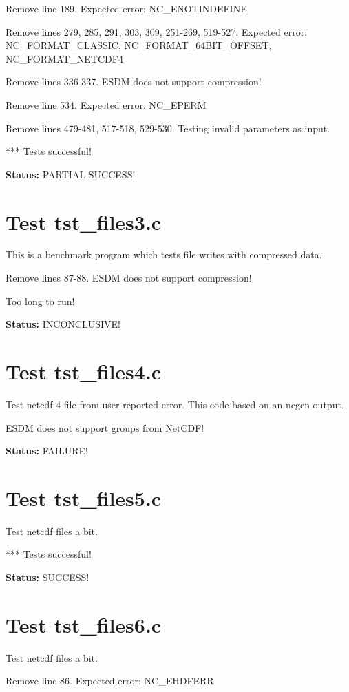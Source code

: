 Remove line 189. Expected error: NC\_ENOTINDEFINE

Remove lines 279, 285, 291, 303, 309, 251-269, 519-527. Expected error: NC\_FORMAT\_CLASSIC, NC\_FORMAT\_64BIT\_OFFSET, NC\_FORMAT\_NETCDF4

Remove lines 336-337. ESDM does not support compression!

Remove line 534. Expected error: NC\_EPERM

Remove lines 479-481, 517-518, 529-530. Testing invalid parameters as input.

*** Tests successful!

{\bf \large Status: } PARTIAL SUCCESS!

\section{Test tst\_files3.c}

This is a benchmark program which tests file writes with compressed data.

Remove lines 87-88. ESDM does not support compression!

Too long to run!

{\bf \large Status: } INCONCLUSIVE!

\section{Test tst\_files4.c}

Test netcdf-4 file from user-reported error. This code based on an ncgen output.

ESDM does not support groups from NetCDF!

{\bf \large Status: } FAILURE!

\section{Test tst\_files5.c}

Test netcdf files a bit.

*** Tests successful!

{\bf \large Status: } SUCCESS!

\section{Test tst\_files6.c}

Test netcdf files a bit.

Remove line 86. Expected error: NC\_EHDFERR

